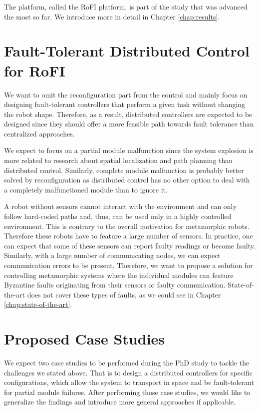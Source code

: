 The platform, called the RoFI platform, is part of the study that was advanced
the most so far. We introduce more in detail in Chapter \ref{chap:results}.

\section{Fault-Tolerant Distributed Control for RoFI}

We want to omit the reconfiguration part from the control and mainly focus on
designing fault-tolerant controllers that perform a given task without changing
the robot shape. Therefore, as a result, distributed controllers are expected to
be designed since they should offer a more feasible path towards fault tolerance
than centralized approaches.

We expect to focus on a partial module malfunction since the system explosion is
more related to research about spatial localization and path planning than
distributed control. Similarly, complete module malfunction is probably better
solved by reconfiguration as distributed control has no other option to deal
with a completely malfunctioned module than to ignore it.

A robot without sensors cannot interact with the environment and can only follow
hard-coded paths and, thus, can be used only in a highly controlled environment.
This is contrary to the overall motivation for metamorphic robots. Therefore
these robots have to feature a large number of sensors. In practice, one can
expect that some of these sensors can report faulty readings or become faulty.
Similarly, with a large number of communicating nodes, we can expect
communication errors to be present. Therefore, we want to propose a solution for
controlling metamorphic systems where the individual modules can feature
Byzantine faults originating from their sensors or faulty communication.
State-of-the-art does not cover these types of faults, as we could see in
Chapter \ref{chap:state-of-the-art}.

\section{Proposed Case Studies}

We expect two case studies to be performed during the PhD study to tackle the
challenges we stated above. That is to design a distributed controllers for
specific configurations, which allow the system to transport in space and be
fault-tolerant for partial module failures. After performing those case studies,
we would like to generalize the findings and introduce more general
approaches if applicable.

